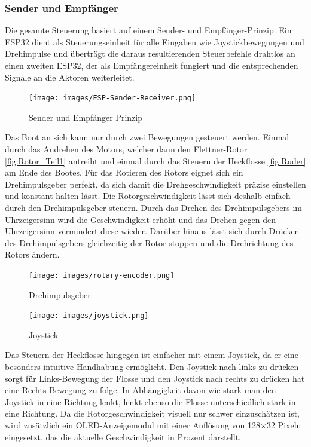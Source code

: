 \documentclass[a4paper,12pt]{article}
\begin{document}
\subsubsection*{Sender und Empfänger}

Die gesamte Steuerung basiert auf einem Sender- und Empfänger-Prinzip. Ein ESP32 dient als Steuerungseinheit für alle Eingaben wie Joystickbewegungen und Drehimpulse und überträgt die daraus resultierenden Steuerbefehle drahtlos an einen zweiten ESP32, der als Empfängereinheit fungiert und die entsprechenden Signale an die Aktoren weiterleitet.
\begin{figure}[H]
    \centering
    \texttt{[image: images/ESP-Sender-Receiver.png]}
    \caption{Sender und Empfänger Prinzip\cite{espnow_diagram}}
    \label{fig:sender-receiver}
\end{figure}
Das Boot an sich kann nur durch zwei Bewegungen gesteuert werden. Einmal durch das Andrehen des Motors, welcher dann den Flettner-Rotor \ref{fig:Rotor_Teil1} antreibt und einmal durch das Steuern der Heckflosse \ref{fig:Ruder} am Ende des Bootes. Für das Rotieren des Rotors eignet sich ein Drehimpulsgeber perfekt, da sich damit die Drehgeschwindigkeit präzise einstellen und konstant halten lässt. Die Rotorgeschwindigkeit lässt sich deshalb einfach durch den Drehimpulsgeber steuern. Durch das Drehen des Drehimpulsgebers im Uhrzeigersinn wird die Geschwindigkeit erhöht und das Drehen gegen den Uhrzeigersinn vermindert diese wieder. Darüber hinaus lässt sich durch Drücken des Drehimpulsgebers gleichzeitig der Rotor stoppen und die Drehrichtung des Rotors ändern.

\begin{figure}[H]
    \centering
    \begin{minipage}[b]{0.4\linewidth}
        \centering
        \texttt{[image: images/rotary-encoder.png]}
        \caption{Drehimpulsgeber\cite{PiHut_RotaryEncoder}}
        \label{fig:rotary-encoder}
    \end{minipage}
    \hspace{1.2em}
    \begin{minipage}[b]{0.4\linewidth}
        \centering
        \texttt{[image: images/joystick.png]}
        \caption{Joystick\cite{switch_dual_axis_joystick}}
        \label{fig:joystick}
    \end{minipage}
\end{figure}

Das Steuern der Heckflosse hingegen ist einfacher mit einem Joystick, da er eine besonders intuitive Handhabung ermöglicht. Den Joystick nach links zu drücken sorgt für Links-Bewegung der Flosse und den Joystick nach rechts zu drücken hat eine Rechts-Bewegung zu folge. In Abhängigkeit davon wie stark man den Joystick in eine Richtung lenkt, lenkt ebenso die Flosse unterschiedlich stark in eine Richtung. \newline
Da die Rotorgeschwindigkeit visuell nur schwer einzuschätzen ist, wird zusätzlich ein OLED-Anzeigemodul mit einer Auflösung von 128×32 Pixeln eingesetzt, das die aktuelle Geschwindigkeit in Prozent darstellt.
\end{document}
